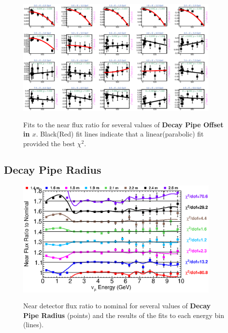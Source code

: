 \begin{figure}[hb]
  \begin{center}
    {\includegraphics[width=4.0in]{figures/DecayPipeOffsetX_near_fits.eps}}
  \end{center}
\caption{ Fits to the near flux ratio for several values of {\bf Decay Pipe Offset in $x$}. Black(Red) fit lines indicate that a linear(parabolic) fit provided the best $\chi^2$. }
\end{figure}

\clearpage
\subsection{Decay Pipe Radius}

\begin{figure}[ht]
  \begin{center}
    {\includegraphics[width=4.0in]{figures/DecayPipeRadius_near_summary.eps}}
  \end{center}
\caption{ Near detector flux ratio to nominal for several values of {\bf Decay Pipe Radius} (points) and the results of the fits to each energy bin (lines).}
\end{figure}


